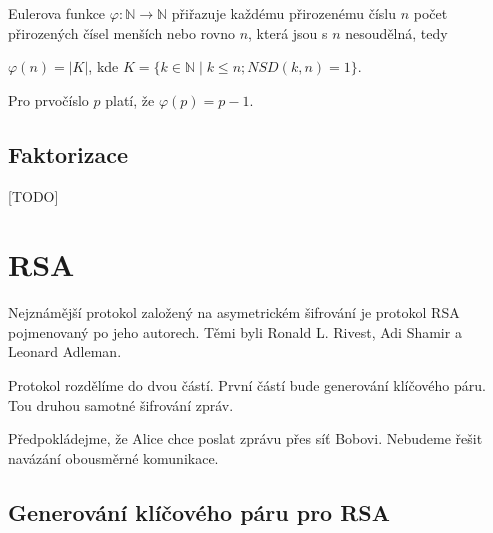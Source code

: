 \documentclass[
  program=infoi,
  biblatex,
  figures=false,
  glossaries,
  index
]{kidiplom}
\begin{document}

    \begin{definition}
        Eulerova funkce $\varphi: \mathbb{N} \rightarrow \mathbb{N}$ přiřazuje každému přirozenému číslu $n$
        počet přirozených čísel menších nebo rovno $n$, která jsou s $n$ nesoudělná, tedy

        \begin{center}
            $\varphi(n) = |K|$, kde $K = \{k \in \mathbb{N} \mid k \leq n; NSD(k,n)=1\}$.
        \end{center}

    \end{definition}

    \begin{theorem}\label{the:euler-function-primes}
        Pro prvočíslo $p$ platí, že $\varphi(p) = p-1$.
    \end{theorem}


    \subsection{Faktorizace}

        [TODO]


\section{RSA}\label{sec:RSA}


    

    Nejznámější protokol založený na asymetrickém šifrování je protokol RSA pojmenovaný po jeho autorech.
    Těmi byli Ronald L. Rivest, Adi Shamir a Leonard Adleman.

    \medskip

    Protokol rozdělíme do dvou částí. První částí bude generování klíčového páru.
    Tou druhou samotné šifrování zpráv.

    \medskip

    Předpokládejme, že Alice chce poslat zprávu přes síť Bobovi.
    Nebudeme řešit navázání obousměrné komunikace.


    \subsection{Generování klíčového páru pro RSA}
\end{document}
